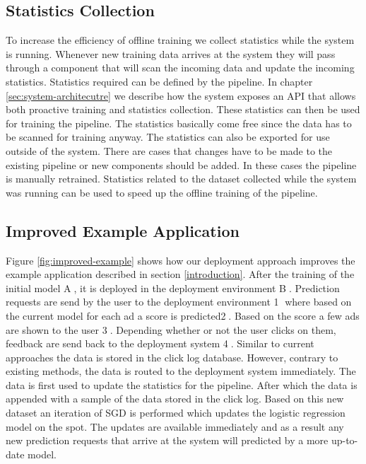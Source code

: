 \subsection{Statistics Collection}
To increase the efficiency of offline training we collect statistics while the system is running.
Whenever new training data arrives at the system they will pass through a component that will scan the incoming data and update the incoming statistics.
Statistics required can be defined by the pipeline.
In chapter \ref{sec:system-architecutre} we describe how the system exposes an API that allows both proactive training and statistics collection.
These statistics can then be used for training the pipeline.
The statistics basically come free since the data has to be scanned for training anyway.
The statistics can also be exported for use outside of the system.
There are cases that changes have to be made to the existing pipeline or new components should be added.
In these cases the pipeline is manually retrained.
Statistics related to the dataset collected while the system was running can be used to speed up the offline training of the pipeline.

\subsection{Improved Example Application}
Figure \ref{fig:improved-example} shows how our deployment approach improves the example application described in section \ref{introduction}.
After the training of the initial model \textcircled{A}, it is deployed in the deployment environment \textcircled{B}.
Prediction requests are send by the user to the deployment environment \textcircled{1} where based on the current model for each ad a score is predicted\textcircled{2}.
Based on the score a few ads are shown to the user \textcircled{3}.
Depending whether or not the user clicks on them, feedback are send back to the deployment system \textcircled{4}.
Similar to current approaches the data is stored in the click log database.
However, contrary to existing methods, the data is routed to the deployment system immediately.
The data is first used to update the statistics for the pipeline.
After which the data is appended with a sample of the data stored in the click log.
Based on this new dataset an iteration of SGD is performed which updates the logistic regression model on the spot.
The updates are available immediately and as a result any new prediction requests that arrive at the system will predicted by a more up-to-date model.

